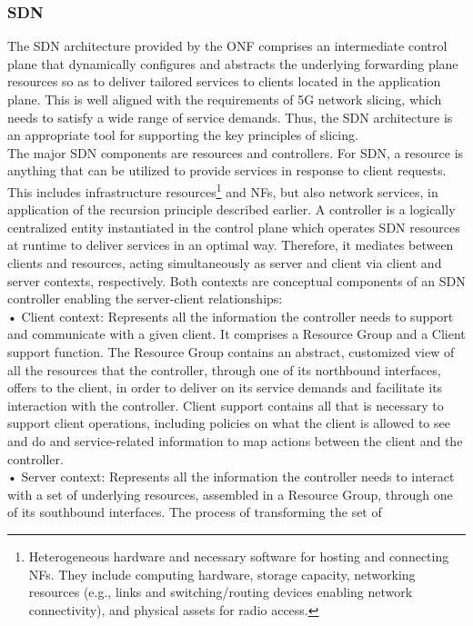 \documentclass{article}
\begin{document}
\subsubsection{SDN}
The SDN architecture provided by the ONF comprises an intermediate control plane that dynamically configures and abstracts the underlying
forwarding plane resources so as to deliver tailored services to clients located in the application plane. This is
well aligned with the requirements of 5G network
slicing, which needs to satisfy a wide range of service demands. Thus, the SDN architecture is an appropriate
tool for supporting the key principles of slicing.\\
The major SDN components are resources and controllers. For
SDN, a resource is anything that can be utilized to
provide services in response to client requests. This
includes infrastructure resources\footnote{Heterogeneous hardware and necessary software for hosting and connecting NFs. They include computing hardware,
storage capacity, networking resources (e.g., links
and switching/routing devices enabling network
connectivity), and physical assets for radio access.
} and NFs, but also
network services, in application of the recursion
principle described earlier. A controller is a logically centralized entity instantiated in the control
plane which operates SDN resources at runtime
to deliver services in an optimal way. Therefore,
it mediates between clients and resources, acting simultaneously as server and client via client
and server contexts, respectively. Both contexts
are conceptual components of an SDN controller
enabling the server-client relationships:\\
• Client context: Represents all the information the
controller needs to support and communicate with
a given client. It comprises a Resource Group and
a Client support function. The Resource Group contains an abstract, customized view of all the resources that the controller, through one of its northbound
interfaces, offers to the client, in order to deliver
on its service demands and facilitate its interaction
with the controller. Client support contains all that
is necessary to support client operations, including
policies on what the client is allowed to see and do and service-related information to map actions
between the client and the controller.\\
• Server context: Represents all the information the controller needs to interact with a set of
underlying resources, assembled in a Resource
Group, through one of its southbound interfaces.
The process of transforming the set of
\end{document}
